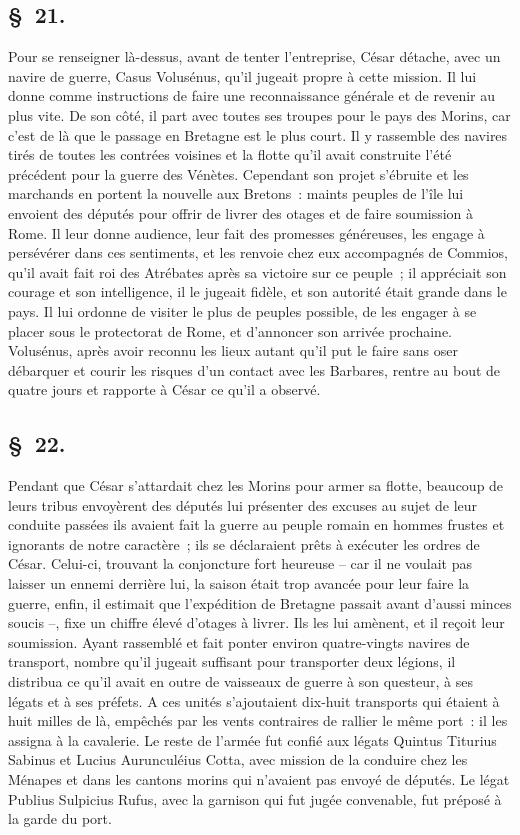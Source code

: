 \documentclass[french,twoside]{book} %
\begin{document}
\subsection[{§ 21.}]{ \textsc{§ 21.} }
\noindent Pour se renseigner là-dessus, avant de tenter l’entreprise, César détache, avec un navire de guerre, Casus Volusénus, qu’il jugeait propre à cette mission. Il lui donne comme instructions de faire une reconnaissance générale et de revenir au plus vite. De son côté, il part avec toutes ses troupes pour le pays des Morins, car c’est de là que le passage en Bretagne est le plus court. Il y rassemble des navires tirés de toutes les contrées voisines et la flotte qu’il avait construite l’été précédent pour la guerre des Vénètes. Cependant son projet s’ébruite et les marchands en portent la nouvelle aux Bretons : maints peuples de l’île lui envoient des députés pour offrir de livrer des otages et de faire soumission à Rome. Il leur donne audience, leur fait des promesses généreuses, les engage à persévérer dans ces sentiments, et les renvoie chez eux accompagnés de Commios, qu’il avait fait roi des Atrébates après sa victoire sur ce peuple ; il appréciait son courage et son intelligence, il le jugeait fidèle, et son autorité était grande dans le pays. Il lui ordonne de visiter le plus de peuples possible, de les engager à se placer sous le protectorat de Rome, et d’annoncer son arrivée prochaine. Volusénus, après avoir reconnu les lieux autant qu’il put le faire sans oser débarquer et courir les risques d’un contact avec les Barbares, rentre au bout de quatre jours et rapporte à César ce qu’il a observé.
\subsection[{§ 22.}]{ \textsc{§ 22.} }
\noindent Pendant que César s’attardait chez les Morins pour armer sa flotte, beaucoup de leurs tribus envoyèrent des députés lui présenter des excuses au sujet de leur conduite passées ils avaient fait la guerre au peuple romain en hommes frustes et ignorants de notre caractère ; ils se déclaraient prêts à exécuter les ordres de César. Celui-ci, trouvant la conjoncture fort heureuse – car il ne voulait pas laisser un ennemi derrière lui, la saison était trop avancée pour leur faire la guerre, enfin, il estimait que l’expédition de Bretagne passait avant d’aussi minces soucis –, fixe un chiffre élevé d’otages à livrer. Ils les lui amènent, et il reçoit leur soumission. Ayant rassemblé et fait ponter environ quatre-vingts navires de transport, nombre qu’il jugeait suffisant pour transporter deux légions, il distribua ce qu’il avait en outre de vaisseaux de guerre à son questeur, à ses légats et à ses préfets. A ces unités s’ajoutaient dix-huit transports qui étaient à huit milles de là, empêchés par les vents contraires de rallier le même port : il les assigna à la cavalerie. Le reste de l’armée fut confié aux légats Quintus Titurius Sabinus et Lucius Aurunculéius Cotta, avec mission de la conduire chez les Ménapes et dans les cantons morins qui n’avaient pas envoyé de députés. Le légat Publius Sulpicius Rufus, avec la garnison qui fut jugée convenable, fut préposé à la garde du port.
\end{document}
